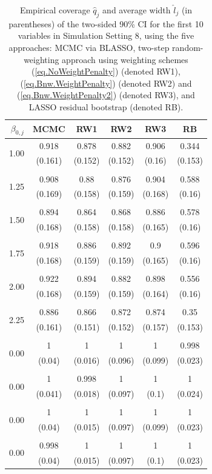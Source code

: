 \documentclass[ejs,authoryear,linksfromyear]{imsart}
\numberwithin{equation}{section}
\theoremstyle{plain}
\begin{document}
\begin{table}[ht]
	\caption{Empirical coverage $\hat{q}_j$ and average width $\hat{l}_j$ (in parentheses) of the two-sided 90\% CI for the first 10 variables in Simulation Setting 8, using the five approaches: MCMC via BLASSO, two-step random-weighting approach using weighting schemes (\ref{eq.NoWeightPenalty}) (denoted RW1), (\ref{eq.Bnw.WeightPenalty}) (denoted RW2) and (\ref{eq.Bnw.WeightPenalty2}) (denoted RW3), and LASSO residual bootstrap (denoted RB).}
	\centering
	\begin{tabular}{r|ccccc}
		\hline
		$\beta_{0,j}$ & MCMC & RW1 & RW2 & RW3 & RB \\ 
		\hline
		\multirow{2}{*}{1.00} & 0.918 & 0.878 & 0.882 & 0.906 & 0.344 \\ 
		& (0.161) & (0.152) & (0.152) & (0.16) & (0.153) \\ 
		&&&&&\\[-.6em]
		\multirow{2}{*}{1.25} & 0.908 & 0.88 & 0.876 & 0.904 & 0.588 \\ 
		& (0.169) & (0.158) & (0.159) & (0.168) & (0.16) \\ 
		&&&&&\\[-.6em]
		\multirow{2}{*}{1.50} & 0.894 & 0.864 & 0.868 & 0.886 & 0.578 \\ 
		& (0.168) & (0.158) & (0.158) & (0.165) & (0.16) \\
		&&&&&\\[-.6em] 
		\multirow{2}{*}{1.75} & 0.918 & 0.886 & 0.892 & 0.9 & 0.596 \\ 
		 & (0.168) & (0.159) & (0.159) & (0.165) & (0.16) \\ 
		 &&&&&\\[-.6em]
		\multirow{2}{*}{2.00} & 0.922 & 0.894 & 0.882 & 0.898 & 0.556 \\ 
		& (0.168) & (0.159) & (0.159) & (0.164) & (0.16) \\ 
		&&&&&\\[-.6em]
		\multirow{2}{*}{2.25} & 0.886 & 0.866 & 0.872 & 0.874 & 0.35 \\ 
		& (0.161) & (0.151) & (0.152) & (0.157) & (0.153) \\ 
		&&&&&\\[-.6em]
		\multirow{2}{*}{0.00} & 1 & 1 & 1 & 1 & 0.998 \\ 
		& (0.04) & (0.016) & (0.096) & (0.099) & (0.023) \\ 
		&&&&&\\[-.6em]
		\multirow{2}{*}{0.00} & 1 & 0.998 & 1 & 1 & 1 \\ 
		& (0.041) & (0.018) & (0.097) & (0.1) & (0.024) \\ 
		&&&&&\\[-.6em]
		\multirow{2}{*}{0.00} & 1 & 1 & 1 & 1 & 1 \\ 
		& (0.04) & (0.015) & (0.097) & (0.099) & (0.023) \\ 
		&&&&&\\[-.6em]
		\multirow{2}{*}{0.00} & 0.998 & 1 & 1 & 1 & 1 \\ 
		& (0.04) & (0.015) & (0.097) & (0.1) & (0.023) \\ 
		\hline
	\end{tabular}
\label{tabl:coverage_width}
\end{table}
\end{document}
